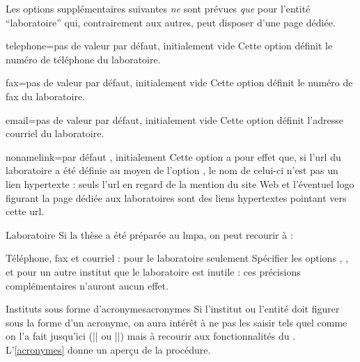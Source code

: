 Les options supplémentaires suivantes \emph{ne} sont prévues
\emph{que} pour l'entité \enquote{laboratoire} qui, contrairement
aux autres, peut disposer d'une page dédiée\pagededieelabo.
%
\begin{docKey}{telephone}{=}{pas de valeur par défaut,
    initialement vide}
  Cette option définit le numéro de téléphone du laboratoire.
\end{docKey}
%
\begin{docKey}{fax}{=}{pas de valeur par défaut,
    initialement vide}
  Cette option définit le numéro de fax du laboratoire.
\end{docKey}
%
\begin{docKey}{email}{=}{pas de valeur par
    défaut, initialement vide}
  Cette option définit l'adresse courriel du laboratoire.
\end{docKey}
%
\begin{docKey}{nonamelink}{=\textbar{}}{par défaut
    , initialement }
  Cette option a pour effet que, si l'\acrshort{url} du laboratoire a été
  définie au moyen de l'option , le nom de celui-ci n'est pas un
  lien hypertexte : seuls l'\acrshort{url} en regard de la mention du site Web
  et l'éventuel logo figurant la page dédiée aux laboratoires\pagededieelabo{}
  sont des liens hypertextes pointant vers cette \acrshort{url}.
\end{docKey}
%
\begin{dbexample}{Laboratoire}{}
  Si la thèse a été préparée au \gls{lmpa}, on peut recourir à :
  \NoAutoSpacing%
\begin{bodycode}
\end{bodycode}
\end{dbexample}
%
\begin{dbremark}{Téléphone, fax et courriel : pour le
    laboratoire seulement}{}
  Spécifier les options , ,  et
   pour un autre institut que le laboratoire est inutile :
  ces précisions complémentaires n'auront aucun effet.
\end{dbremark}
%
\begin{dbremark}{Instituts sous forme d'acronymes}{acronymes}
  Si l'institut ou l'entité doit figurer sous la forme d'un acronyme, on aura
  intérêt à ne pas les saisir tels quel comme on l'a fait jusqu'ici
  (|| ou ||) mais à recourir aux
  fonctionnalités du . L'\vref{acronymes} donne un aperçu
  de la procédure.
\end{dbremark}

